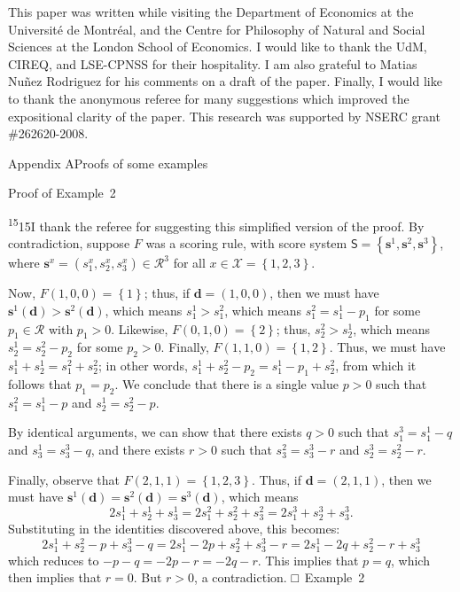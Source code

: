 \documentclass[
]{article}
\begin{document}
This paper was written while visiting the Department of Economics at the
Université de Montréal, and the Centre for Philosophy of Natural and
Social Sciences at the London School of Economics. I would like to thank
the UdM, CIREQ, and LSE-CPNSS for their hospitality. I am also grateful
to Matias Nuñez Rodriguez for his comments on a draft of the paper.
Finally, I would like to thank the anonymous referee for many
suggestions which improved the expositional clarity of the paper. This
research was supported by NSERC grant \#262620-2008.

\protect{}\label{s000025}
Appendix AProofs of some examples

Proof of Example~2

\textsuperscript{15}15I thank the referee for suggesting this simplified
version of the proof. By contradiction, suppose \(F\) was a scoring
rule, with score system
\(\mathsf{S} = \left\{ \mathbf{s}^{1},\mathbf{s}^{2},\mathbf{s}^{3} \right\}\),
where
\(\mathbf{s}^{x} = \left( s_{1}^{x},s_{2}^{x},s_{3}^{x} \right) \in \mathcal{R}^{3}\)
for all \(x \in \mathcal{X} = \left\{ 1,2,3 \right\}\).

Now, \(F(1,0,0) = \left\{ 1 \right\}\); thus, if
\(\mathbf{d} = (1,0,0)\), then we must have
\(\mathbf{s}^{1}\left( \mathbf{d} \right) > \mathbf{s}^{2}\left( \mathbf{d} \right)\),
which means \(s_{1}^{1} > s_{1}^{2}\), which means
\(s_{1}^{2} = s_{1}^{1} - p_{1}\) for some \(p_{1} \in \mathcal{R}\)
with \(p_{1} > 0\). Likewise, \(F(0,1,0) = \left\{ 2 \right\}\); thus,
\(s_{2}^{2} > s_{2}^{1}\), which means \(s_{2}^{1} = s_{2}^{2} - p_{2}\)
for some \(p_{2} > 0\). Finally, \(F(1,1,0) = \left\{ 1,2 \right\}\).
Thus, we must have \(s_{1}^{1} + s_{2}^{1} = s_{1}^{2} + s_{2}^{2}\); in
other words,
\(s_{1}^{1} + s_{2}^{2} - p_{2} = s_{1}^{1} - p_{1} + s_{2}^{2}\), from
which it follows that \(p_{1} = p_{2}\). We conclude that there is a
single value \(p > 0\) such that \(s_{1}^{2} = s_{1}^{1} - p\) and
\(s_{2}^{1} = s_{2}^{2} - p\).

By identical arguments, we can show that there exists \(q > 0\) such
that \(s_{1}^{3} = s_{1}^{1} - q\) and \(s_{3}^{1} = s_{3}^{3} - q\),
and there exists \(r > 0\) such that \(s_{3}^{2} = s_{3}^{3} - r\) and
\(s_{2}^{3} = s_{2}^{2} - r\).

Finally, observe that \(F(2,1,1) = \left\{ 1,2,3 \right\}\). Thus, if
\(\mathbf{d} = (2,1,1)\), then we must have
\(\mathbf{s}^{1}\left( \mathbf{d} \right) = \mathbf{s}^{2}\left( \mathbf{d} \right) = \mathbf{s}^{3}\left( \mathbf{d} \right)\),
which means
\[2s_{1}^{1} + s_{2}^{1} + s_{3}^{1} = 2s_{1}^{2} + s_{2}^{2} + s_{3}^{2} = 2s_{1}^{3} + s_{2}^{3} + s_{3}^{3}\text{.}\]
Substituting in the identities discovered above, this becomes:
\[2s_{1}^{1} + s_{2}^{2} - p + s_{3}^{3} - q = 2s_{1}^{1} - 2p + s_{2}^{2} + s_{3}^{3} - r = 2s_{1}^{1} - 2q + s_{2}^{2} - r + s_{3}^{3}\]
which reduces to \(- p - q = - 2p - r = - 2q - r\). This implies that
\(p = q\), which then implies that \(r = 0\). But \(r > 0\), a
contradiction. □~Example~2
\end{document}
